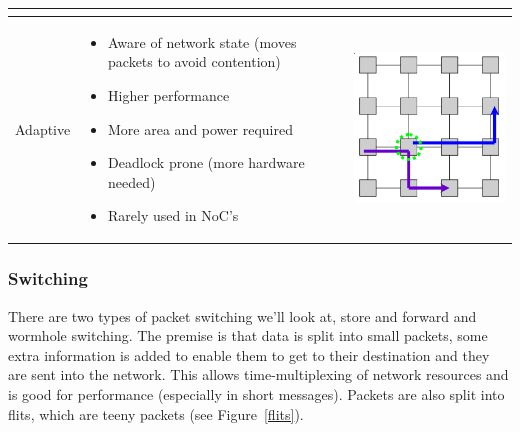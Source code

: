 \begin{center}
\begin{tabular}{| m{2cm} | m{5cm} | c |}
\begin{minipage}{.3\textwidth}
\begin{center}
      \end{center}
    \end{minipage} \\ \hline
    Adaptive & 
    \begin{itemize}
      \item Aware of network state (moves packets to avoid contention)
      \item Higher performance
      \item More area and power required
      \item Deadlock prone (more hardware needed)
      \item Rarely used in NoC's
    \end{itemize} & 
    \begin{minipage}{.3\textwidth}
      \begin{center}
        \includegraphics[width=0.5\linewidth]{images/adaptive}
      \end{center}
    \end{minipage} \\ \hline
  \end{tabular}
\end{center}

\subsubsection{Switching}

There are two types of packet switching we'll look at, store and forward and
wormhole switching. The premise is that data is split into small packets, some
extra information is added to enable them to get to their destination and they
are sent into the network. This allows time-multiplexing of network resources
and is good for performance (especially in short messages). Packets are also
split into flits, which are teeny packets (see Figure~\ref{flits}).


